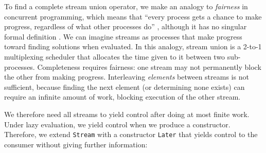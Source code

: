 \documentclass[acmsmall,screen,dvipsnames,svgnames]{acmart}
\newcommand\hask[1]{\texttt{#1}}
\newcommand\todo[1]{{\color{Orange}#1}}
\renewcommand\todo[1]{{\color{IndianRed}#1}}
\begin{document}




To find a complete stream union operator, we make an analogy to \emph{fairness} in concurrent programming, which means that ``every process gets a chance to make progress, regardless of what other processes do'' \citep{DBLP:journals/toplas/OwickiL82}%
, although it has no singular formal definition \citep{Kwiatkowska1989,DBLP:conf/concur/VolzerVK05}%
.
We can imagine streams as processes that make progress toward finding solutions when evaluated.
In this analogy, stream union is a 2-to-1 multiplexing scheduler that allocates the time given to it between two sub-processes.
Completeness requires fairness: one stream may not permanently block the other from making progress.
Interleaving \emph{elements} between streams is not sufficient, because finding the next element (or determining none exists) can require an infinite amount of work, blocking execution of the other stream.

We therefore need all streams to yield control after doing at most finite work.
Under lazy evaluation, we yield control when we produce a constructor.
Therefore, we extend \hask{Stream} with a constructor \hask{Later} that yields control to the consumer without giving further information:
\end{document}
